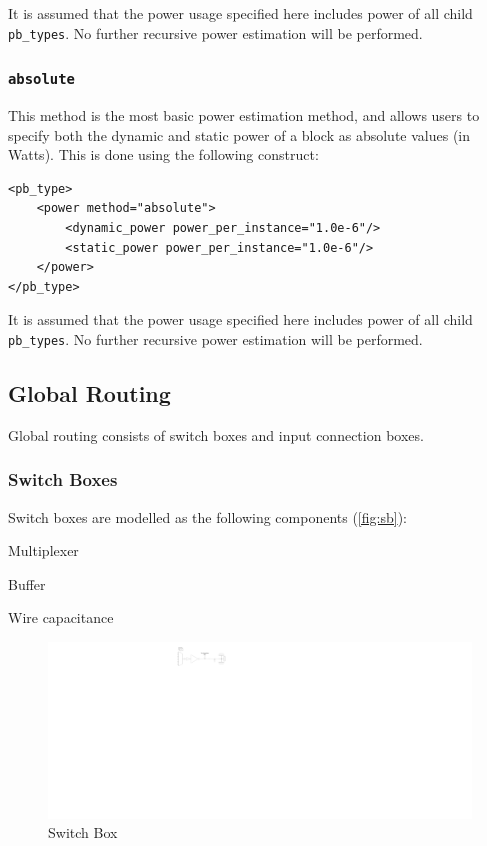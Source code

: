 \documentclass[letterpaper,twoside,10pt]{article}
\begin{document}
It is assumed that the power usage specified here includes power of all child \texttt{pb\_types}.  No further recursive power estimation will be performed.

\subsubsection{\texttt{absolute}}
This method is the most basic power estimation method, and allows users to specify both the dynamic and static power of a block as absolute values (in Watts).  This is done using the following construct:

\begin{BVerbatim}[bgcolor=LightGray, boxwidth=\textwidth] 
<pb_type>
	<power method="absolute">
		<dynamic_power power_per_instance="1.0e-6"/>
		<static_power power_per_instance="1.0e-6"/>
	</power>
</pb_type>
\end{BVerbatim}

It is assumed that the power usage specified here includes power of all child \texttt{pb\_types}.  No further recursive power estimation will be performed.

\subsection{Global Routing}	
Global routing consists of switch boxes and input connection boxes.

\subsubsection{Switch Boxes} \label{sec:sb}
Switch boxes are modelled as the following components (\autoref{fig:sb}):
\vspace{-10pt}
\begin{enumerate*}
	\item Multiplexer 
	\item Buffer
	\item Wire capacitance
\end{enumerate*}


\begin{figure}[ht]
	\centering
		\includegraphics[scale=0.7]{images/sb.pdf}
	\caption{Switch Box}
	\label{fig:sb}
\end{figure}
\end{document}
